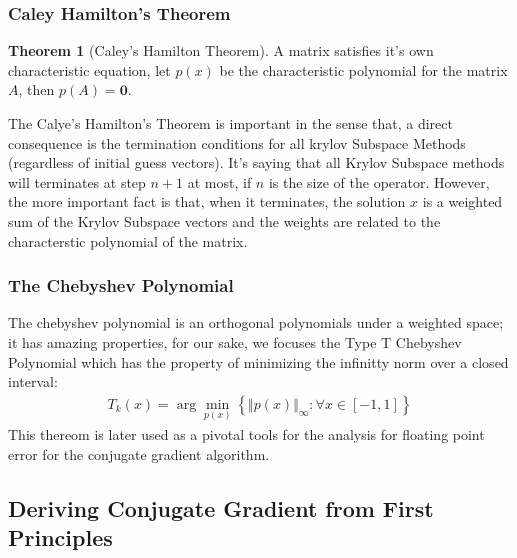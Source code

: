 \documentclass[]{article}
\theoremstyle{definition}
\newtheorem{theorem}{Theorem}  %
\begin{document}
        \subsubsection{Caley Hamilton's Theorem}
            \begin{theorem}[Caley's Hamilton Theorem]\label{theorem:Caley_Hamilton}
                A matrix satisfies it's own characteristic equation, let $p(x)$ be the characteristic polynomial for the matrix $A$, then $p(A) = \mathbf 0$. 
            \end{theorem}
            The Calye's Hamilton's Theorem is important in the sense that, a direct consequence is the termination conditions for all krylov Subspace Methods (regardless of initial guess vectors). It's saying that all Krylov Subspace methods will terminates at step $n + 1$ at most, if $n$ is the size of the operator. However, the more important fact is that, when it terminates, the solution $x$ is a weighted sum of the Krylov Subspace vectors and the weights are related to the characterstic polynomial of the matrix. 
        \subsubsection{The Chebyshev Polynomial}
            The chebyshev polynomial is an orthogonal polynomials under a weighted space; it has amazing properties, for our sake, we focuses the Type T Chebyshev Polynomial which has the property of minimizing the infinitty norm over a closed interval: 
            \begin{align}
                T_k(x) = \arg\min_{p(x)}
                \left\lbrace
                    \Vert p(x) \Vert_\infty: \forall x \in [-1, 1]
                \right\rbrace
            \end{align}
            This thereom is later used as a pivotal tools for the analysis for floating point error for the conjugate gradient algorithm. 

    \subsection{Deriving Conjugate Gradient from First Principles}
\end{document}
